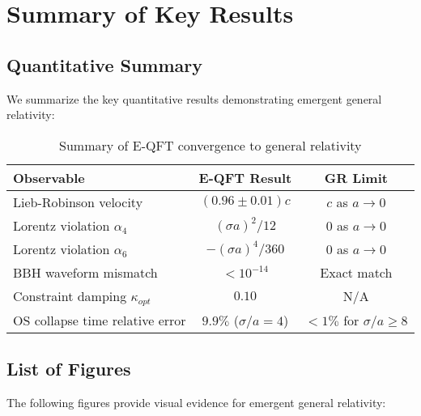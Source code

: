 \documentclass[11pt,a4paper]{article}
\begin{document}
\section{Summary of Key Results}

\subsection{Quantitative Summary}

We summarize the key quantitative results demonstrating emergent general relativity:

\begin{table}[H]
\centering
\caption{Summary of E-QFT convergence to general relativity}
\begin{tabular}{lcc}
\hline
\textbf{Observable} & \textbf{E-QFT Result} & \textbf{GR Limit} \\
\hline
Lieb-Robinson velocity & $(0.96 \pm 0.01)c$ & $c$ as $a \to 0$ \\
Lorentz violation $\alpha_4$ & $(\sigma a)^2/12$ & $0$ as $a \to 0$ \\
Lorentz violation $\alpha_6$ & $-(\sigma a)^4/360$ & $0$ as $a \to 0$ \\
BBH waveform mismatch & $< 10^{-14}$ & Exact match \\
Constraint damping $\kappa_{opt}$ & $0.10$ & N/A \\
OS collapse time relative error & $9.9\%$ ($\sigma/a = 4$) & $< 1\%$ for $\sigma/a \geq 8$ \\
\hline
\end{tabular}
\end{table}

\subsection{List of Figures}

The following figures provide visual evidence for emergent general relativity:
\end{document}
